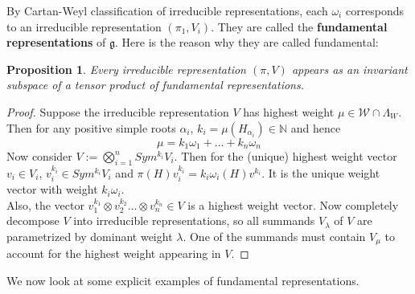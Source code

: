 \documentclass[11pt]{book}
\newtheorem{proposition}[theorem]{Proposition}
\newcommand{\bb}[1]{\mathbb{#1}}
\newcommand{\mc}[1]{\mathcal{#1}}
\newcommand{\mf}[1]{\mathfrak{#1}}
\begin{document}
By Cartan-Weyl classification of irreducible representations, each $\omega_i$ corresponds to an irreducible representation $(\pi_1,V_i)$. They are called the \textbf{fundamental representations} of $\mf{g}$. Here is the reason why they are called fundamental:
\begin{proposition}
Every irreducible representation $(\pi,V)$ appears as an invariant subspace of a tensor product of fundamental representations.
\end{proposition}
\begin{proof}
Suppose the irreducible representation $V$ has highest weight $\mu \in \mc{W} \cap \Lambda_W$. Then for any positive simple roots $\alpha_i$, $k_i = \mu(H_{\alpha_i}) \in \bb{N}$ and hence
$$\mu = k_1\omega_1 + \dots + k_n \omega_n$$
Now consider $V := \bigotimes_{i=1}^{n} Sym^{k_i}V_i$. Then for the (unique) highest weight vector $v_i \in V_i$, $v_i^{k_i} \in Sym^{k_i}V_i$ and $\pi(H)v_i^{k_i} = k_i\omega_i(H)v^{k_i}$. It is the unique weight vector with weight $k_i\omega_i$.\\
Also, the vector $v_1^{k_1} \otimes v_2^{k_2} \dots \otimes v_n^{k_n} \in V$ is a highest weight vector. Now completely decompose $V$ into irreducible representations, so all summands $V_{\lambda}$ of $V$ are parametrized by dominant weight $\lambda$. One of the summands must contain $V_{\mu}$ to account for the highest weight appearing in $V$.
\end{proof}
We now look at some explicit examples of fundamental representations.
\end{document}
